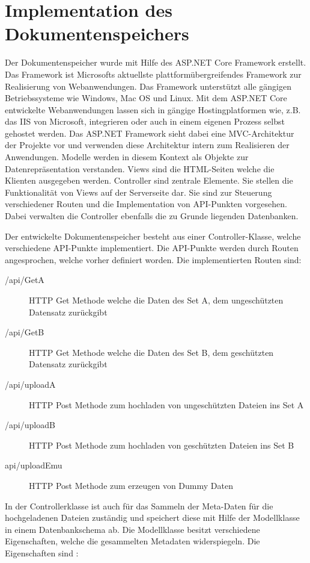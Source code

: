 \documentclass[
    fontsize=12pt,
    headings=small,
    parskip=half,           %
    bibliography=totoc,
    numbers=noenddot,       %
    open=any,               %
    ]{scrreprt}
\begin{document}
\newpage
\section{Implementation des Dokumentenspeichers}
Der Dokumentenspeicher wurde mit Hilfe des ASP.NET Core Framework erstellt. 
Das Framework ist Microsofts aktuellste plattformübergreifendes Framework zur Realisierung von Webanwendungen.
Das Framework unterstützt alle gängigen Betriebssysteme wie Windows, Mac OS und Linux.
Mit dem ASP.NET Core entwickelte Webanwendungen lassen sich in gängige Hostingplatformen wie, z.B. das IIS von Microsoft, integrieren oder auch in einem eigenen Prozess selbst gehostet werden. 
Das ASP.NET Framework sieht dabei eine MVC-Architektur der Projekte vor und verwenden diese Architektur intern zum Realisieren der Anwendungen. 
Modelle werden in diesem Kontext als Objekte zur Datenrepräsentation verstanden. 
Views sind die HTML-Seiten welche die Klienten ausgegeben werden.
Controller sind zentrale Elemente. 
Sie stellen die Funktionalität von Views auf der Serverseite dar.
Sie sind zur Steuerung verschiedener Routen und die Implementation von API-Punkten vorgesehen.
Dabei verwalten die Controller ebenfalls die zu Grunde liegenden Datenbanken.

Der entwickelte Dokumentenspeicher besteht aus einer Controller-Klasse, welche verschiedene API-Punkte implementiert. 
Die API-Punkte werden durch Routen angesprochen, welche vorher definiert worden. 
Die implementierten Routen sind: 

\begin{description}
\item[/api/GetA] HTTP Get Methode welche die Daten des Set A, dem ungeschützten Datensatz zurückgibt 
\item[/api/GetB] HTTP Get Methode welche die Daten des Set B, dem geschützten Datensatz zurückgibt
\item[/api/uploadA] HTTP Post Methode zum hochladen von ungeschützten Dateien ins Set A
\item[/api/uploadB] HTTP Post Methode zum hochladen von geschützten Dateien ins Set B
\item[api/uploadEmu] HTTP Post Methode zum erzeugen von Dummy Daten
\end{description}

In der Controllerklasse ist auch für das Sammeln der Meta-Daten für die hochgeladenen Dateien zuständig und speichert diese mit Hilfe der Modellklasse in einem Datenbankschema ab. 
Die Modellklasse besitzt verschiedene Eigenschaften, welche die gesammelten Metadaten widerspiegeln. 
Die Eigenschaften sind : 
\end{document}
